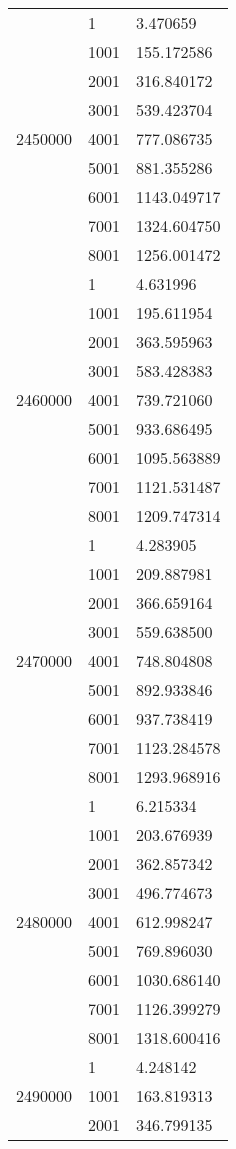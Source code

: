 \begin{table}[htb!]
\begin{tabular}{lll}
\multirow[c]{9}{*}{2450000} & 1 & 3.470659 \\
 & 1001 & 155.172586 \\
 & 2001 & 316.840172 \\
 & 3001 & 539.423704 \\
 & 4001 & 777.086735 \\
 & 5001 & 881.355286 \\
 & 6001 & 1143.049717 \\
 & 7001 & 1324.604750 \\
 & 8001 & 1256.001472 \\
\multirow[c]{9}{*}{2460000} & 1 & 4.631996 \\
 & 1001 & 195.611954 \\
 & 2001 & 363.595963 \\
 & 3001 & 583.428383 \\
 & 4001 & 739.721060 \\
 & 5001 & 933.686495 \\
 & 6001 & 1095.563889 \\
 & 7001 & 1121.531487 \\
 & 8001 & 1209.747314 \\
\multirow[c]{9}{*}{2470000} & 1 & 4.283905 \\
 & 1001 & 209.887981 \\
 & 2001 & 366.659164 \\
 & 3001 & 559.638500 \\
 & 4001 & 748.804808 \\
 & 5001 & 892.933846 \\
 & 6001 & 937.738419 \\
 & 7001 & 1123.284578 \\
 & 8001 & 1293.968916 \\
\multirow[c]{9}{*}{2480000} & 1 & 6.215334 \\
 & 1001 & 203.676939 \\
 & 2001 & 362.857342 \\
 & 3001 & 496.774673 \\
 & 4001 & 612.998247 \\
 & 5001 & 769.896030 \\
 & 6001 & 1030.686140 \\
 & 7001 & 1126.399279 \\
 & 8001 & 1318.600416 \\
\multirow[c]{9}{*}{2490000} & 1 & 4.248142 \\
 & 1001 & 163.819313 \\
 & 2001 & 346.799135 \\

\end{tabular}
\end{table}
